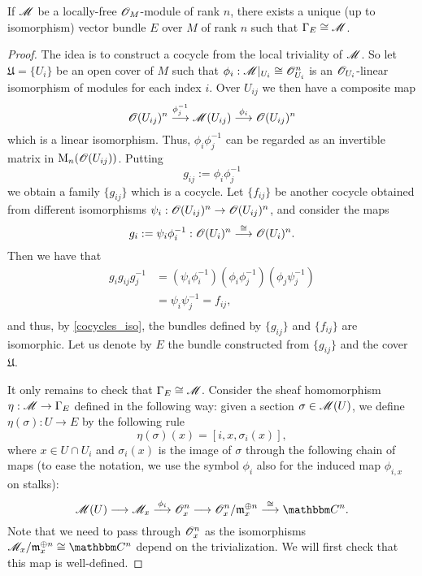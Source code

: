 \begin{theorem}\label{sheaf_bundle}
If $\mathscr{M}$ be a locally-free $\mathscr{O}_M$-module of rank $n$, there exists a unique (up to isomorphism) vector bundle $E$ over $M$ of rank $n$ such that $\Gamma_E\cong \mathscr{M}$.
\end{theorem}
\begin{proof}
The idea is to construct a cocycle from the local triviality of $\mathscr{M}$. So let $\mathfrak{U}=\{U_i\}$ be an open cover of $M$ such that $\phi_i:\mathscr{M}|_{U_i}\cong \mathscr{O}_{U_i}^n$ is an $\mathscr{O}_{U_i}$-linear isomorphism of modules for each index $i$. Over $U_{ij}$ we then have a composite map
$$\mathscr{O}(U_{ij})^n\stackrel{\phi_j^{-1}}{\longrightarrow}\mathscr{M}(U_{ij})\stackrel{\phi_i}{\longrightarrow}\mathscr{O}(U_{ij})^n$$
which is a linear isomorphism. Thus, $\phi_i\phi_j^{-1}$ can be regarded as an invertible matrix in $\operatorname{M}_n(\mathscr{O}(U_{ij}))$. Putting
$$g_{ij}:=\phi_i\phi_j^{-1}$$
we obtain a family $\{g_{ij}\}$ which is a cocycle. Let $\{f_{ij}\}$ be another cocycle obtained from different isomorphisms $\psi_i:\mathscr{O}(U_{ij})^n\to \mathscr{O}(U_{ij})^n$, and consider the maps
$$g_i:=\psi_i\phi_i^{-1}:\mathscr{O}(U_i)^n\stackrel{\cong}{\longrightarrow}\mathscr{O}(U_i)^n.$$
Then we have that
$$
\begin{aligned}
g_ig_{ij}g_j^{-1} &= (\psi_i\phi_i^{-1})(\phi_i\phi_j^{-1})(\phi_j\psi_j^{-1}) \\
                  &= \psi_i\psi_j^{-1} = f_{ij}, \\
\end{aligned}
$$
and thus, by \ref{cocycles_iso}, the bundles defined by $\{g_{ij}\}$ and $\{f_{ij}\}$ are isomorphic. Let us denote by $E$ the bundle constructed from $\{g_{ij}\}$ and the cover $\mathfrak{U}$.

It only remains to check that $\Gamma_E\cong \mathscr{M}$. Consider the sheaf homomorphism $\eta :\mathscr{M}\to \Gamma_E$ defined in the following way: given a section $\sigma \in \mathscr{M}(U)$, we define $\eta (\sigma ):U\to E$ by the following rule
$$\eta (\sigma )(x)=[i,x,\sigma_i (x)],$$
where $x\in U\cap U_i$ and $\sigma_i(x)$ is the image of $\sigma$ through the following chain of maps (to ease the notation, we use the symbol $\phi_i$ also for the induced map $\phi_{i,x}$ on stalks):
$$\scr{M}(U)\longrightarrow \scr{M}_x\stackrel{\phi_i}{\longrightarrow}\scr{O}^n_x\longrightarrow \scr{O}^n_x/\mathfrak{m}^{\oplus n}_x\stackrel{\cong}{\longrightarrow}\comp^n.$$
Note that we need to pass through $\mathscr{O}_x^n$ as the isomorphisms $\scr{M}_x/\mathfrak{m}^{\oplus n}_x\cong \comp^n$ depend on the trivialization. We will first check that this map is well-defined.


\end{proof}
